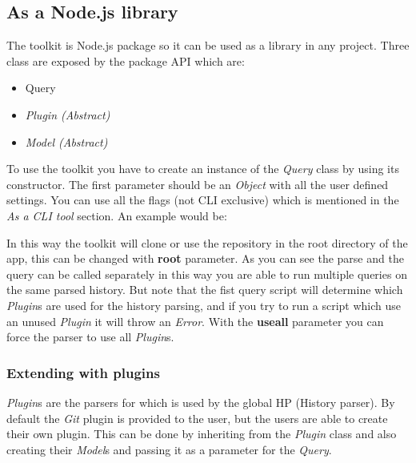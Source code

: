 \subsection{As a Node.js library}

The toolkit is Node.js package so it can be used as a library in any project.
Three class are exposed by the package API which are:

\begin{itemize}
	\item Query
	\item \textit{Plugin (Abstract)}
	\item \textit{Model (Abstract)}
\end{itemize}

To use the toolkit you have to create an instance of the \textit{Query} class by using its constructor.
The first parameter should be an \textit{Object} with all the user defined settings. 
You can use all the flags (not CLI exclusive) which is mentioned in the \textit{As a CLI tool} section.
An example would be:



In this way the toolkit will clone or use the repository in the root directory of the app, this can be changed with \textbf{root} parameter.
As you can see the parse and the query can be called separately in this way you are able to run multiple queries on the same parsed history.
But note that the fist query script will determine which \textit{Plugin}s are used for the history parsing, and if you try to run a script which
use an unused \textit{Plugin} it will throw an \textit{Error}. With the \textbf{useall} parameter you can force the parser to use all \textit{Plugin}s.

\subsubsection{Extending with plugins}

\textit{Plugin}s are the parsers for which is used by the global HP (History parser). 
By default the \textit{Git} plugin is provided to the user, but the users are able to create their own plugin.
\newline
This can be done by inheriting from the \textit{Plugin} class and also creating their \textit{Model}s and passing it as a parameter for the \textit{Query}.

